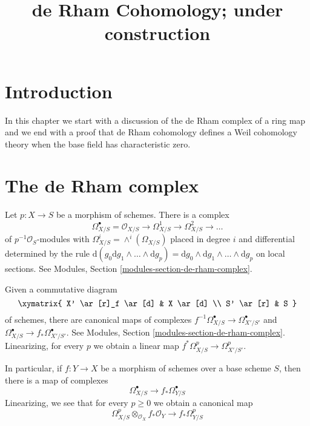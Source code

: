 

%


\title{de Rham Cohomology; under construction}


\maketitle

\label{section-phantom}

\tableofcontents

\section{Introduction}
\label{section-introduction}

\noindent
In this chapter we start with a discussion of the de Rham complex
of a ring map and we end with a proof that de Rham cohomology
defines a Weil cohomology theory when the base field has characteristic zero.




\section{The de Rham complex}
\label{section-de-rham-complex}

\noindent
Let $p : X \to S$ be a morphism of schemes. There is a complex
$$
\Omega^\bullet_{X/S} =
\mathcal{O}_{X/S} \to \Omega^1_{X/S} \to \Omega^2_{X/S} \to \ldots
$$
of $p^{-1}\mathcal{O}_S$-modules with
$\Omega^i_{X/S} = \wedge^i(\Omega_{X/S})$
placed in degree $i$ and differential determined by the rule
$\text{d}(g_0 \text{d}g_1 \wedge \ldots \wedge \text{d}g_p) =
\text{d}g_0 \wedge \text{d}g_1 \wedge \ldots \wedge \text{d}g_p$
on local sections.
See Modules, Section \ref{modules-section-de-rham-complex}.

\medskip\noindent
Given a commutative diagram
$$
\xymatrix{
X' \ar[r]_f \ar[d] & X \ar[d] \\
S' \ar[r] & S
}
$$
of schemes, there are canonical maps of complexes
$f^{-1}\Omega_{X/S}^\bullet \to \Omega^\bullet_{X'/S'}$ and
$\Omega_{X/S}^\bullet \to f_*\Omega^\bullet_{X'/S'}$.
See Modules, Section \ref{modules-section-de-rham-complex}.
Linearizing, for every $p$ we obtain a linear map
$f^*\Omega^p_{X/S} \to \Omega^p_{X'/S'}$.

\medskip\noindent
In particular, if $f : Y \to X$ be a morphism of schemes over
a base scheme $S$, then there is a map of complexes
$$
\Omega^\bullet_{X/S} \longrightarrow f_*\Omega^\bullet_{Y/S}
$$
Linearizing, we see that for every $p \geq 0$ we obtain a canonical map
$$
\Omega^p_{X/S} \otimes_{\mathcal{O}_X} f_*\mathcal{O}_Y
\longrightarrow
f_*\Omega^p_{Y/S}
$$

